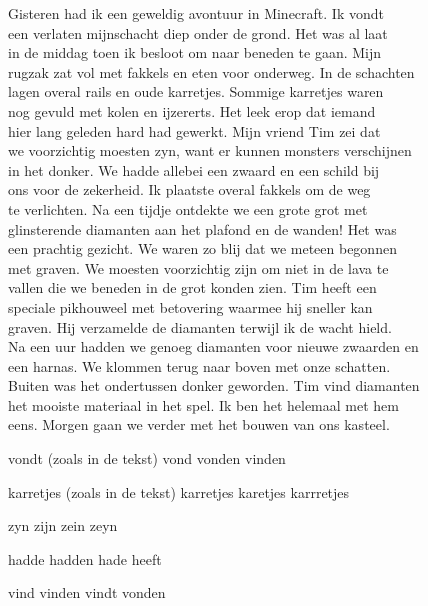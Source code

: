 \begin{opgave}

\begin{tekstmetfouten}
Gisteren had ik een geweldig avontuur in Minecraft. Ik vondt\\
een verlaten mijnschacht diep onder de grond. Het was al laat\\
in de middag toen ik besloot om naar beneden te gaan. Mijn\\
rugzak zat vol met fakkels en eten voor onderweg. In de schachten\\
lagen overal rails en oude karretjes. Sommige karretjes waren\\
nog gevuld met kolen en ijzererts. Het leek erop dat iemand\\
hier lang geleden hard had gewerkt. Mijn vriend Tim zei dat\\
we voorzichtig moesten zyn, want er kunnen monsters verschijnen\\
in het donker. We hadde allebei een zwaard en een schild bij\\
ons voor de zekerheid. Ik plaatste overal fakkels om de weg\\
te verlichten. Na een tijdje ontdekte we een grote grot met\\
glinsterende diamanten aan het plafond en de wanden! Het was\\
een prachtig gezicht. We waren zo blij dat we meteen begonnen\\
met graven. We moesten voorzichtig zijn om niet in de lava te\\
vallen die we beneden in de grot konden zien. Tim heeft een\\
speciale pikhouweel met betovering waarmee hij sneller kan\\
graven. Hij verzamelde de diamanten terwijl ik de wacht hield.\\
Na een uur hadden we genoeg diamanten voor nieuwe zwaarden en\\
een harnas. We klommen terug naar boven met onze schatten.\\
Buiten was het ondertussen donker geworden. Tim vind diamanten\\
het mooiste materiaal in het spel. Ik ben het helemaal met hem\\
eens. Morgen gaan we verder met het bouwen van ons kasteel.
\end{tekstmetfouten}

\begin{vragen}
%
{vondt (zoals in de tekst)}%
{vond}%
{vonden}%
{vinden}

%
{karretjes (zoals in de tekst)}%
{karretjes}%
{karetjes}%
{karrretjes}

%
{zyn}%
{zijn}%
{zein}%
{zeyn}

%
{hadde}%
{hadden}%
{hade}%
{heeft}

%
{vind}%
{vinden}%
{vindt}%
{vonden}
\end{vragen}

\end{opgave}

